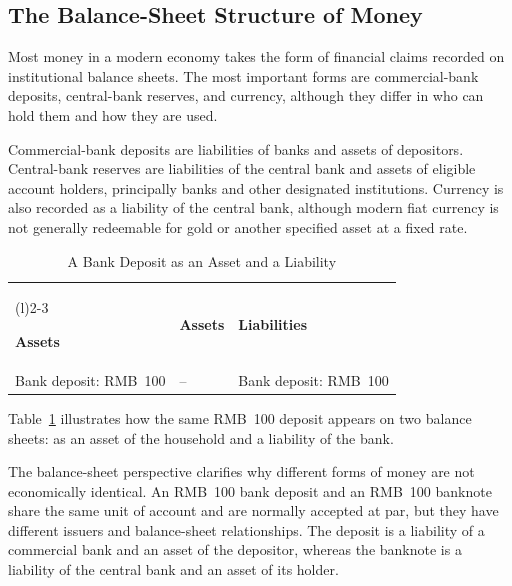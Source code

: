 \subsection{The Balance-Sheet Structure of Money}

Most money in a modern economy takes the form of financial claims recorded on institutional balance sheets. The most important forms are commercial-bank deposits, central-bank reserves, and currency, although they differ in who can hold them and how they are used.

Commercial-bank deposits are liabilities of banks and assets of depositors. Central-bank reserves are liabilities of the central bank and assets of eligible account holders, principally banks and other designated institutions. Currency is also recorded as a liability of the central bank, although modern fiat currency is not generally redeemable for gold or another specified asset at a fixed rate.

\begin{table}[H]
\centering
\caption{A Bank Deposit as an Asset and a Liability}
\label{tab:ch2-deposit-taccount}

\renewcommand{\arraystretch}{1.25}

\begin{tabularx}{0.9\textwidth}{
    @{}
    >{\raggedright\arraybackslash}X
    >{\raggedright\arraybackslash}X
    >{\raggedright\arraybackslash}X
    @{}
}
\toprule
\multicolumn{1}{c}{\textbf{Household}}
&
\multicolumn{2}{c}{\textbf{Commercial Bank}}
\\
\cmidrule(r){1-1}
\cmidrule(l){2-3}

\textbf{Assets}
&
\textbf{Assets}
&
\textbf{Liabilities}
\\

Bank deposit: RMB~100
&
--
&
Bank deposit: RMB~100
\\

\bottomrule
\end{tabularx}
\end{table}

Table~\ref{tab:ch2-deposit-taccount} illustrates how the same RMB~100 deposit appears on two balance sheets: as an asset of the household and a liability of the bank.

The balance-sheet perspective clarifies why different forms of money are not economically identical. 
An RMB~100 bank deposit and an RMB~100 banknote share the same unit of account and are normally accepted at par, but they have different issuers and balance-sheet relationships. The deposit is a liability of a commercial bank and an asset of the depositor, whereas the banknote is a liability of the central bank and an asset of its holder.


